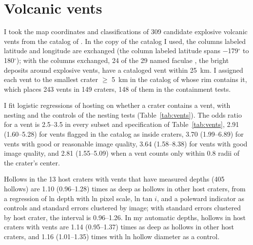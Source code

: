 \documentclass{planetary}
\begin{document}
\clearpage


\section{Volcanic vents}
\label{sec:ventsS}

I took the map coordinates and classifications of 309 candidate explosive volcanic vents from the catalog of \textcite{pegg2021}. In the copy of the catalog I used, the columns labeled latitude and longitude are exchanged (the column labeled latitude spans $-$179$^\circ$ to 180$^\circ$); with the columns exchanged, 24 of the 29 named faculae \parencite{iau_gazetteer}, the bright deposits around explosive vents, have a cataloged vent within 25~km. I assigned each vent to the smallest crater $\geq$ 5~km in the catalog of \textcite{herrick2018} whose rim contains it, which places 243 vents in 149 craters, 148 of them in the containment tests.

I fit logistic regressions of hosting on whether a crater contains a vent, with nesting and the controls of the nesting tests (Table~\ref{tab:vents}). The odds ratio for a vent is 2.5--3.5 in every subset and specification of Table~\ref{tab:vents}, 2.91 (1.60--5.28) for vents flagged in the catalog as inside craters, 3.70 (1.99--6.89) for vents with good or reasonable image quality, 3.64 (1.58--8.38) for vents with good image quality, and 2.81 (1.55--5.09) when a vent counts only within 0.8 radii of the crater's center.

Hollows in the 13 host craters with vents that have measured depths (405 hollows) are 1.10 (0.96--1.28) times as deep as hollows in other host craters, from a regression of ln depth with ln pixel scale, ln tan $i$, and a poleward indicator as controls and standard errors clustered by image; with standard errors clustered by host crater, the interval is 0.96--1.26. In my automatic depths, hollows in host craters with vents are 1.14 (0.95--1.37) times as deep as hollows in other host craters, and 1.16 (1.01--1.35) times with ln hollow diameter as a control.
\end{document}
